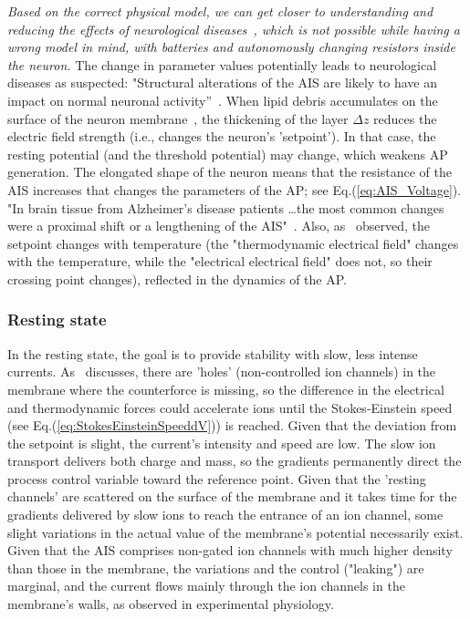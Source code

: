 \textit{Based on the correct physical model, we can get closer to understanding and reducing the effects of neurological diseases~\cite{AlzheimerDisease:2022,ParkinsonDisease:2024},
which is not possible while having a wrong model in mind,
with batteries and autonomously changing resistors inside the neuron.} 
The change in parameter values potentially leads to neurological diseases as suspected: "Structural alterations of the \gls{AIS} are likely to have an impact on normal neuronal activity”~\cite{AlzheimerDisease:2022}. 
When lipid debris accumulates on the surface of the neuron membrane~\cite{AlzheimerDisease:2022}, the thickening of the layer $\Delta z$ reduces the electric field strength (i.e., changes the neuron's 'setpoint'). In that case, the resting potential (and the threshold potential) may change, which weakens \gls{AP} generation.
The elongated shape of the neuron means that the resistance of the 
\gls{AIS} increases that changes the parameters of the \gls{AP};
see Eq.(\ref{eq:AIS_Voltage}).
"In brain tissue from Alzheimer’s disease patients \dots the most common changes were a proximal shift or a lengthening of the AIS"~\cite{AlzheimerDisease:2022}.  
Also, as~\cite{TemperatureOnAP:2022} observed, the setpoint changes with temperature (the "thermodynamic electrical field" changes with the temperature, while the "electrical electrical field" does not, so their crossing point changes), reflected in the dynamics of the \gls{AP}.
\else

\fi


\ifx\magyar\undefined

\subsubsection{Resting state\label{sec:PHYSICS_RESTINGSTATE}}
In the resting state, the goal is to provide stability with slow, less intense currents. As~\cite{PrinciplesNeuralScience:2013} discusses, there are 'holes' (non-controlled ion channels) in the membrane where the counterforce is missing, so
the difference in the electrical and thermodynamic forces could accelerate ions until the Stokes-Einstein speed (see Eq.(\ref{eq:StokesEinsteinSpeeddV})) is reached.
Given that the deviation from the setpoint is slight, the current's intensity and speed are low. 
The slow ion transport delivers both charge and mass, so the gradients
permanently direct the process control variable toward the reference point. Given that the 'resting channels' are scattered on the surface of the membrane and it takes time for the gradients delivered by slow ions to reach the entrance of an ion channel, some slight variations 
in the actual value of the membrane's potential necessarily exist.
Given that the \gls{AIS} comprises non-gated ion channels with much higher density than those in the membrane, the variations and the control ("leaking") are marginal, and the current flows mainly through the ion channels in the membrane's walls, as observed in experimental physiology.
\else

